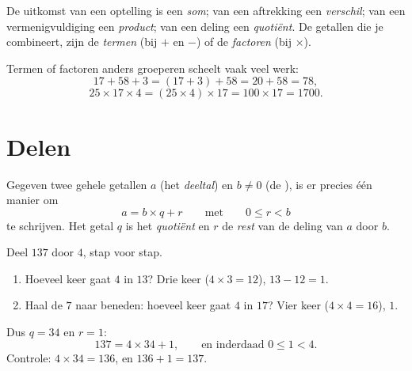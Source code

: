\begin{remark}[Woorden]
De uitkomst van een optelling is een \emph{som}; van een
aftrekking een \emph{verschil}; van een vermenigvuldiging een
\emph{product}; van een deling een
\emph{quotiënt}. De getallen die je combineert, zijn de
\emph{termen} (bij $+$ en $-$) of de \emph{factoren} (bij $\times$).
\end{remark}

\begin{example}\label{ex:g6:wholes:smart}
Termen of factoren anders groeperen scheelt vaak veel werk:
\[
17 + 58 + 3 = (17 + 3) + 58 = 20 + 58 = 78 ,
\]
\[
25 \times 17 \times 4 = (25 \times 4) \times 17 = 100 \times 17 = 1700 .
\]
\end{example}

\section{Delen}

\begin{theorem}\label{thm:g6:wholes:division}
Gegeven twee gehele getallen $a$ (het \emph{deeltal}) en $b \neq 0$ (de
\emph{}), is er precies één manier om
\[
a = b \times q + r
\qquad\text{met}\qquad
0 \leq r < b
\]
te schrijven. Het getal $q$ is het \emph{quotiënt} en $r$ de
\emph{rest} van de deling van $a$ door $b$.
\end{theorem}
\admitted

\begin{example}\label{ex:g6:wholes:division}
Deel $137$ door $4$, stap voor stap.
\begin{enumerate}
  \item Hoeveel keer gaat $4$ in $13$? Drie keer ($4 \times 3 = 12$), 
        $13 - 12 = 1$.
  \item Haal de $7$ naar beneden: hoeveel keer gaat $4$ in $17$? Vier keer
        ($4 \times 4 = 16$),  $1$.
\end{enumerate}
Dus $q = 34$ en $r = 1$:
\[
137 = 4 \times 34 + 1, \qquad\text{en inderdaad } 0 \leq 1 < 4 .
\]
Controle: $4 \times 34 = 136$, en $136 + 1 = 137$.
\end{example}

